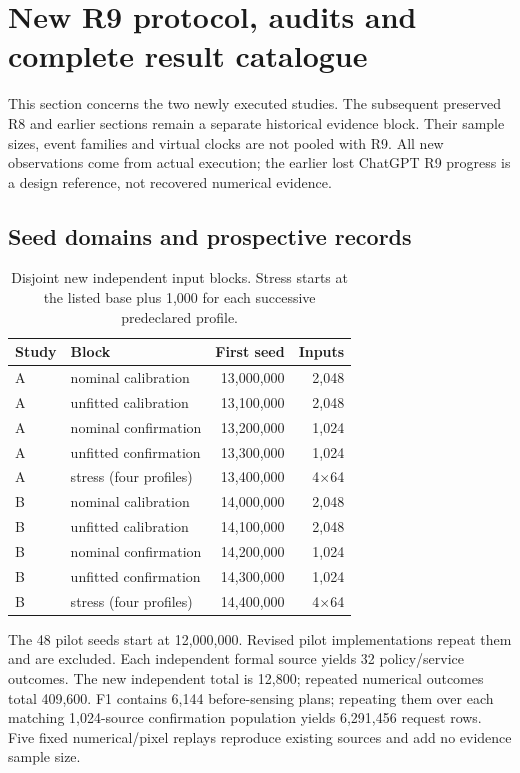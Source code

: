 \section{New R9 protocol, audits and complete result catalogue}\label{supp:r9}
This section concerns the two newly executed studies. The subsequent preserved R8 and earlier sections remain a separate historical evidence block. Their sample sizes, event families and virtual clocks are not pooled with R9. All new observations come from actual execution; the earlier lost ChatGPT R9 progress is a design reference, not recovered numerical evidence.

\subsection{Seed domains and prospective records}
\begin{table}[!htbp]\centering\small
\caption{Disjoint new independent input blocks. Stress starts at the listed base plus 1,000 for each successive predeclared profile.}\label{supp:r9-seeds}
\begin{tabular}{@{}llrr@{}}\toprule
Study & Block & First seed & Inputs\\\midrule
A & nominal calibration &13,000,000&2,048\\
A & unfitted calibration &13,100,000&2,048\\
A & nominal confirmation &13,200,000&1,024\\
A & unfitted confirmation &13,300,000&1,024\\
A & stress (four profiles)&13,400,000&4$\times$64\\
B & nominal calibration &14,000,000&2,048\\
B & unfitted calibration &14,100,000&2,048\\
B & nominal confirmation &14,200,000&1,024\\
B & unfitted confirmation &14,300,000&1,024\\
B & stress (four profiles)&14,400,000&4$\times$64\\\bottomrule
\end{tabular}\end{table}
The 48 pilot seeds start at 12,000,000. Revised pilot implementations repeat them and are excluded. Each independent formal source yields 32 policy/service outcomes. The new independent total is 12,800; repeated numerical outcomes total 409,600. F1 contains 6,144 before-sensing plans; repeating them over each matching 1,024-source confirmation population yields 6,291,456 request rows. Five fixed numerical/pixel replays reproduce existing sources and add no evidence sample size.

